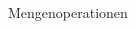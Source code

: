 \documentclass[t]{beamer}
\theoremstyle{plain}
\begin{document}
\begin{frame}{Mengenoperationen}
\begin{columns}
\begin{column}{.35\textwidth}
{            %
}
\end{column}
\end{columns}
\end{frame}
\end{document}
